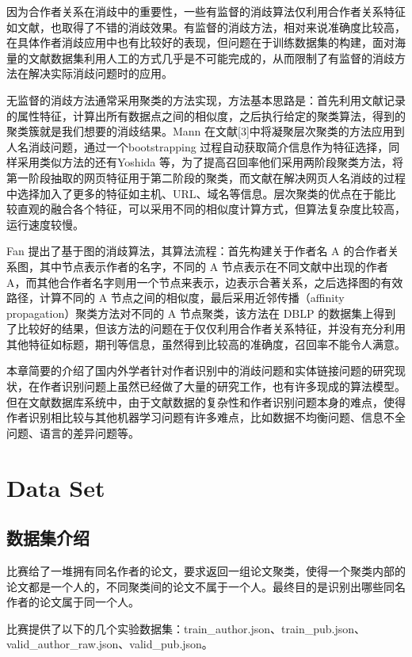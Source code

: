 \documentclass[sigchi]{acmart}
\begin{document}
因为合作者关系在消歧中的重要性，一些有监督的消歧算法仅利用合作者关系特征如文献\cite{WoodingWilcox-Jay-462}，也取得了不错的消歧效果。有监督的消歧方法，相对来说准确度比较高，在具体作者消歧应用中也有比较好的表现，但问题在于训练数据集的构建，面对海量的文献数据集利用人工的方式几乎是不可能完成的，从而限制了有监督的消歧方法在解决实际消歧问题时的应用。

无监督的消歧方法通常采用聚类的方法实现，方法基本思路是：首先利用文献记录的属性特征，计算出所有数据点之间的相似度，之后执行给定的聚类算法，得到的聚类簇就是我们想要的消歧结果。Mann 在文献[3]中将凝聚层次聚类的方法应用到人名消歧问题，通过一个bootstrapping 过程自动获取简介信息作为特征选择，同样采用类似方法的还有Yoshida 等\cite{YoshidaIkeda-464}，为了提高召回率他们采用两阶段聚类方法，将第一阶段抽取的网页特征用于第二阶段的聚类，而文献\cite{ElmaciogluTan-465}在解决网页人名消歧的过程中选择加入了更多的特征如主机、URL、域名等信息。层次聚类的优点在于能比较直观的融合各个特征，可以采用不同的相似度计算方式，但算法复杂度比较高，运行速度较慢。

Fan 提出了基于图的消歧算法\cite{FanWang-466}，其算法流程：首先构建关于作者名 A 的合作者关系图，其中节点表示作者的名字，不同的 A 节点表示在不同文献中出现的作者 A，而其他合作者名字则用一个节点来表示，边表示合著关系，之后选择图的有效路径，计算不同的 A 节点之间的相似度，最后采用近邻传播（affinity propagation）聚类方法对不同的 A 节点聚类，该方法在 DBLP 的数据集上得到了比较好的结果，但该方法的问题在于仅仅利用合作者关系特征，并没有充分利用其他特征如标题，期刊等信息，虽然得到比较高的准确度，召回率不能令人满意。

本章简要的介绍了国内外学者针对作者识别中的消歧问题和实体链接问题的研究现状，在作者识别问题上虽然已经做了大量的研究工作，也有许多现成的算法模型。但在文献数据库系统中，由于文献数据的复杂性和作者识别问题本身的难点，使得作者识别相比较与其他机器学习问题有许多难点，比如数据不均衡问题、信息不全问题、语言的差异问题等。


\section{Data Set}
\subsection{数据集介绍}
比赛给了一堆拥有同名作者的论文，要求返回一组论文聚类，使得一个聚类内部的论文都是一个人的，不同聚类间的论文不属于一个人。最终目的是识别出哪些同名作者的论文属于同一个人。

比赛提供了以下的几个实验数据集：train\_author.json、train\_pub.json、 valid\_author\_raw.json、valid\_pub.json。 
\end{document}
